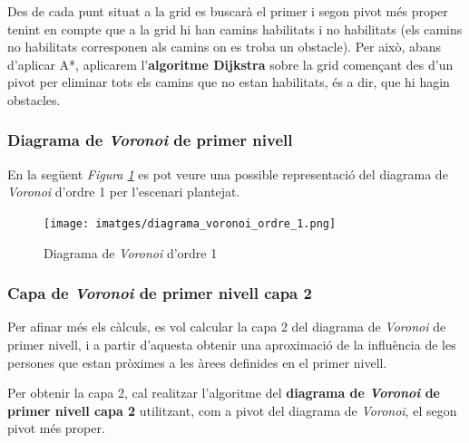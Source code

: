 \documentclass[12pt]{article}
\begin{document}
Des de cada punt situat a la grid es buscarà el primer i segon pivot més proper tenint en compte que a la grid hi han camins habilitats i no habilitats (els camins no habilitats corresponen als camins on es troba un obstacle). Per això, abans d'aplicar A*, aplicarem l'\textbf{algoritme Dijkstra} sobre la grid començant des d'un pivot per eliminar tots els camins que no estan habilitats, és a dir, que hi hagin obstacles.

\subsubsection{Diagrama de \textit{Voronoi} de primer nivell} 

En la següent \textit{Figura \ref{fig:diagrama_voronoi_ordre_1}} es pot veure una possible representació del diagrama de \textit{Voronoi} d'ordre 1 per l'escenari plantejat.

\begin{figure}[H]
	\centering
	\texttt{[image: imatges/diagrama\_voronoi\_ordre\_1.png]}
	\caption{Diagrama de \textit{Voronoi} d'ordre 1}
	\label{fig:diagrama_voronoi_ordre_1}
\end{figure}

\subsubsection{Capa de \textit{Voronoi} de primer nivell capa 2}
Per afinar més els càlculs, es vol calcular la capa 2 del diagrama de \textit{Voronoi} de primer nivell, i a partir d'aquesta obtenir una aproximació de la influència de les persones que estan pròximes a les àrees definides en el primer nivell.

Per obtenir la capa 2, cal realitzar l'algoritme del \textbf{diagrama de \textit{Voronoi} de primer nivell capa 2} utilitzant, com a pivot del diagrama de \textit{Voronoi}, el segon pivot més proper.



\end{document}
